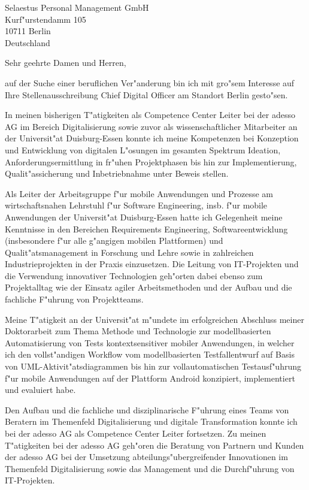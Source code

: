 \documentclass[10pt,a4paper]{dinbrief}
\date{\today}
\begin{document}
 
\begin{letter}  
{%
	Selaestus Personal Management GmbH\\
	Kurf"urstendamm 105\\
	10711 Berlin\\ 
	Deutschland
}
\subject{\bf Bewerbung Chief Digital Officer}
\opening{Sehr geehrte Damen und Herren,}
auf der Suche einer beruflichen Ver"anderung bin ich mit gro"sem Interesse auf Ihre Stellenausschreibung Chief Digital Officer am Standort Berlin gesto"sen. 

In meinen bisherigen T"atigkeiten als Competence Center Leiter bei der adesso AG im Bereich Digitalisierung sowie zuvor als wissenschaftlicher Mitarbeiter an der Universit"at Duisburg-Essen konnte ich meine Kompetenzen bei Konzeption und Entwicklung von digitalen L"osungen im gesamten Spektrum Ideation, Anforderungsermittlung in fr"uhen Projektphasen bis hin zur Implementierung, Qualit"assicherung und Inbetriebnahme unter Beweis stellen.

Als Leiter der Arbeitsgruppe f"ur mobile Anwendungen und Prozesse am wirtschaftsnahen Lehrstuhl f"ur Software Engineering, insb. f"ur mobile Anwendungen der Universit"at Duisburg-Essen hatte ich Gelegenheit meine Kenntnisse in den Bereichen Requirements Engineering, Softwareentwicklung (insbesondere f"ur alle g"angigen mobilen Plattformen) und Qualit"atsmanagement in Forschung und Lehre sowie in zahlreichen Industrieprojekten in der Praxis einzusetzen. Die Leitung von IT-Projekten und die Verwendung innovativer Technologien geh"orten dabei ebenso zum Projektalltag wie der Einsatz agiler Arbeitsmethoden und der Aufbau und die fachliche  F"uhrung von Projektteams.

Meine T"atigkeit an der Universit"at m"undete im erfolgreichen Abschluss meiner Doktor\-arbeit zum Thema Methode und Technologie zur modellbasierten Automatisierung von Tests kontextsensitiver mobiler Anwendungen, in welcher ich den vollst"andigen Workflow vom modellbasierten Testfallentwurf auf Basis von UML-Aktivit"atsdiagrammen bis hin zur vollautomatischen Testausf"uhrung f"ur mobile Anwendungen auf der Plattform Android konzipiert, implementiert und evaluiert habe.

\clearpage
Den Aufbau und die fachliche und disziplinarische F"uhrung eines Teams von Beratern im Themenfeld Digitalisierung und digitale Transformation konnte ich bei der adesso AG als Competence Center Leiter fortsetzen. Zu meinen T"atigkeiten bei der adesso AG geh"oren die Beratung von Partnern und Kunden der adesso AG bei der Umsetzung abteilungs"ubergreifender Innovationen im Themenfeld Digitalisierung sowie das Management und die Durchf"uhrung von IT-Projekten.


\end{letter}
\end{document}
